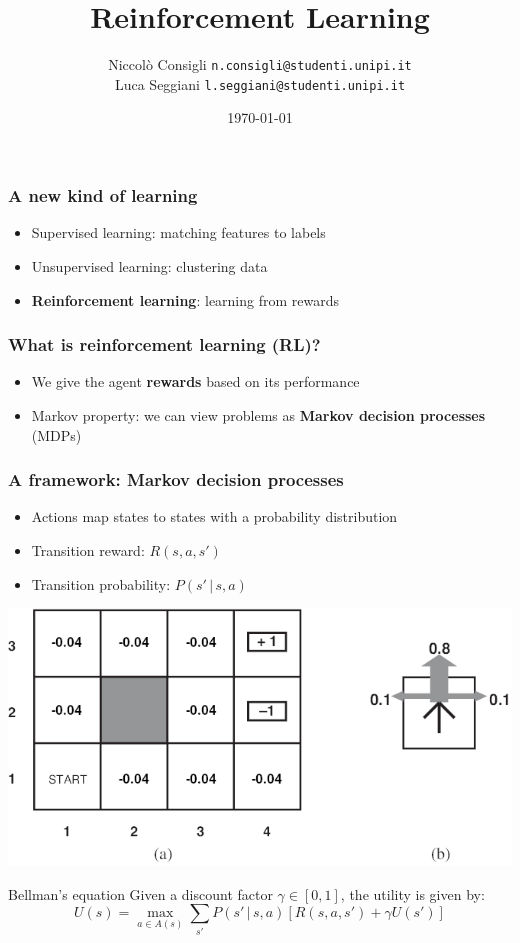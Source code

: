 \documentclass{beamer}
\title{Reinforcement Learning}
\author{
    Niccolò Consigli
		\scriptsize \texttt{n.consigli@studenti.unipi.it}
		\\
		\normalsize
    Luca Seggiani
		\scriptsize \texttt{l.seggiani@studenti.unipi.it}
		\normalsize
	}
\institute{Università di Pisa}
\date{\today}
\begin{document}
\begin{frame}
	\titlepage
\end{frame}

\begin{frame}
	\frametitle{A new kind of learning}
	\begin{itemize}
		\item<1-> Supervised learning: matching features to labels
		\item<2-> Unsupervised learning: clustering data
		\item<3-> \textbf{Reinforcement learning}: learning from rewards
	\end{itemize}
\end{frame}

\begin{frame}
	\frametitle{What is reinforcement learning (RL)?}
	\begin{itemize}
		\item<1-> We give the agent \textbf{rewards} based on its performance
		\item<2-> Markov property: we can view problems as \textbf{Markov decision processes} (MDPs)
	\end{itemize}
\end{frame}

\begin{frame}
	\frametitle{A framework: Markov decision processes}
	\begin{itemize}
		\item Actions map states to states with a probability distribution
		\item Transition reward: $R(s, a, s')$
		\item Transition probability: $P(s' \, | \, s, a)$
	\end{itemize}
	\begin{center}
		\includegraphics[scale=0.95]{figures/markov-decisional-process.png}
	\end{center}
	\begin{block}{Bellman's equation}
		Given a discount factor $\gamma \in [0, 1]$, the utility is given by:
		$$
		U(s) = \max_{a \in A(s)} \sum_{s'} P(s' \, | \, s, a) \left[ R(s, a, s') + \gamma U(s') \right]
		$$
	\end{block}
\end{frame}
\end{document}
